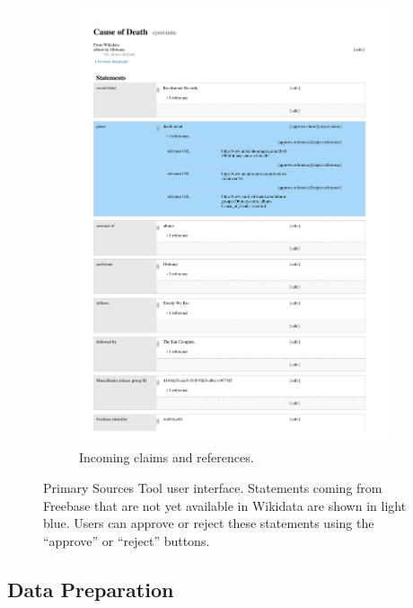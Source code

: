 \documentclass{acm_proc_article-sp}
\begin{document}
\begin{figure}[!t]
\begin{subfigure}[b]{1.0\columnwidth}
        \includegraphics[width=\textwidth]{img/wikidata-cause-of-death.pdf}
        \caption{Incoming claims and references.}
        \label{fig:cause-of-death}
    \end{subfigure}
    \caption{Primary Sources Tool user interface. Statements coming from
       Freebase that are not yet available in Wikidata are shown in light blue.
       Users can approve or reject these statements using the ``approve'' or ``reject'' buttons.}
    \label{fig:primary-sources-tool}
\end{figure}


\subsection{Data Preparation}
\end{document}
